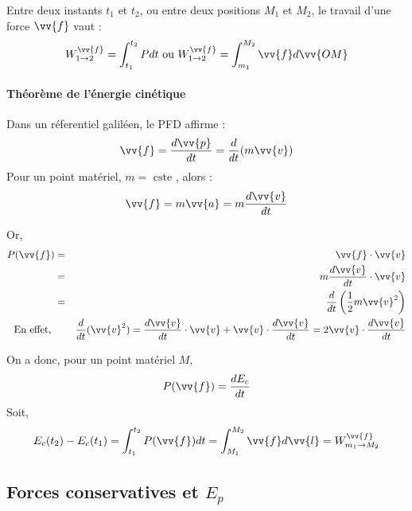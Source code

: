 \begin{remark}
    Entre deux instants \(t_{1}\) et \(t_{2}\), ou entre deux positions \(M_{1}\) et \(M_{2}\), le travail d'une force \(\vv{f}\) vaut : 
    \[
        W_{ 1 \to 2}^{\vv{f}} = \int_{t_{1}}^{t_{2}} P  dt \text{ ou } W_{1 \to 2}^{\vv{f}} = \int_{m_{1}}^{M_{2}} \vv{f}  d \vv{OM}
    \]     
\end{remark}

\paragraph{Théorème de l'énergie cinétique}
Dans un réferentiel galiléen, le PFD affirme : 
\[
    \vv{f} = \frac{d\vv{p}}{dt} = \frac{d}{dt}(m\vv{v})
\]
Pour un point matériel, \(m = \text{ cste } \), alors  :
\[
    \vv{f} = m\vv{a} = m \frac{d\vv{v}}{dt}
\] 

Or, 
\begin{eqnarray*}
    P(\vv{f}) &=& \vv{f} \cdot \vv{v} \\
    &=& m \frac{d\vv{v}}{dt} \cdot \vv{v} \\
    &=& \frac{d}{dt}\left( \frac{1}{2} m \vv{v}^{2} \right) \\
    \text{ En effet, }  && \frac{d}{dt}(\vv{v}^{2}) = \frac{d\vv{v}}{dt} \cdot \vv{v} + \vv{v} \cdot \frac{d\vv{v}}{dt} = 2 \vv{v} \cdot \frac{d\vv{v}}{dt}
\end{eqnarray*}

\begin{theorem}
    On a donc, pour un point matériel \(M\), 
    \[
        P(\vv{f}) = \frac{dE_{c}}{dt}
    \]
    Soit,
    \[
        E_{c}(t_{2}) - E_{c}(t_{1}) = \int_{t_{1}}^{t_{2}} P(\vv{f})  dt = \int_{M_{1}}^{M_{2}} \vv{f}  d\vv{l} = W_{m_{1} \to  M_{2}}^{\vv{f}}
    \]
\end{theorem}

\subsection{Forces conservatives et \(E_{p}\) }

